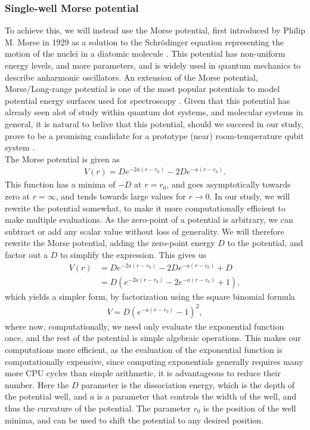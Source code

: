 \documentclass{subfiles}
\begin{document}
\subsubsection*{Single-well Morse potential}
To achieve this, we will instead use the Morse potential, first introduced by Philip M. Morse in 1929 as a solution to the Schrödinger equation representing the motion of the nuclei in a diatomic molecule \cite{morse1929diatomic}. This potential has non-uniform energy levels, and more parameters, and is widely used in quantum mechanics to describe anharmonic oscillators. An extension of the Morse potential, Morse/Long-range potential is one of the most popular potentials to model potential energy surfaces used for spectroscopy \cite{zhai2018constructing}. Given that this potential has already seen alot of study within quantum dot systems, and molecular systems in general, it is natural to belive that this potential, should we succeed in our study, prove to be a promising candidate for a prototype (near) room-temperature qubit system \cite{khordad2014linear, hayrapetyan2015exciton, sargsian2021effects}. \\
The Morse potential is given as
\begin{align*}
    V(r) = De^{-2a(r-r_0)} - 2De^{-a(r-r_0)}.
\end{align*}
This function has a minima of $-D$ at $r = r_0$, and goes asymptotically towards zero at $r=\infty$, and tends towards large values for $r\rightarrow0$. In our study, we will rewrite the potential somewhat, to make it more computationally efficient to make multiple evaluations. As the zero-point of a potential is arbitrary, we can subtract or add any scalar value without loss of generality. We will therefore rewrite the Morse potential, adding the zero-point energy $D$ to the potential, and factor out a $D$ to simplify the expression. This gives us
\begin{align*}
    V(r) &= De^{-2a(r-r_0)} - 2De^{-a(r-r_0)} + D \\
    &= D(e^{-2a(r-r_0)} - 2e^{-a(r-r_0)} + 1),
\end{align*}
which yields a simpler form, by factorization using the square binomial formula
\begin{align}
    V = D(e^{-a(r-r_0)} - 1)^2\label{eq:morse_potential},
\end{align}
where now, computationally, we need only evaluate the exponential function once, and the rest of the potential is simple algebraic operations. This makes our computations more efficient, as the evaluation of the exponential function is computationally expensive, since computing exponentials generally requires many more CPU cycles than simple arithmetic, it is advantageous to reduce their number. Here the $D$ parameter is the dissociation energy, which is the depth of the potential well, and $a$ is a parameter that controls the width of the well, and thus the curvature of the potential. The parameter $r_0$ is the position of the well minima, and can be used to shift the potential to any desired position.\\
\end{document}
